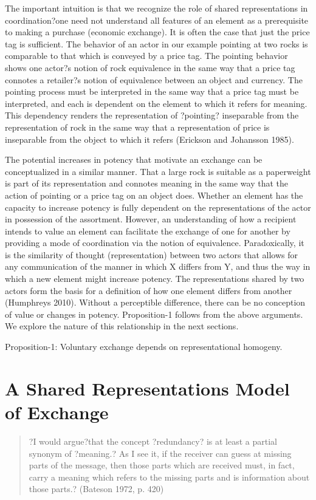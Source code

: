 The important intuition is that we recognize the role of shared representations in coordination?one need not understand all features of an element as a prerequisite to making a purchase (economic exchange). It is often the case that just the price tag is sufficient. The behavior of an actor in our example pointing at two rocks is comparable to that which is conveyed by a price tag. The pointing behavior shows one actor?s notion of rock equivalence in the same way that a price tag connotes a retailer?s notion of equivalence between an object and currency. The pointing process must be interpreted in the same way that a price tag must be interpreted, and each is dependent on the element to which it refers for meaning. This dependency renders the representation of ?pointing? inseparable from the representation of rock in the same way that a representation of price is inseparable from the object to which it refers (Erickson and Johansson 1985). 

The potential increases in potency that motivate an exchange can be conceptualized in a similar manner. That a large rock is suitable as a paperweight is part of its representation and connotes meaning in the same way that the action of pointing or a price tag on an object does. Whether an element has the capacity to increase potency is fully dependent on the representations of the actor in possession of the assortment. However, an understanding of how a recipient intends to value an element can facilitate the exchange of one for another by providing a mode of coordination via the notion of equivalence.
Paradoxically, it is the similarity of thought (representation) between two actors that allows for any communication of the manner in which X differs from Y, and thus the way in which a new element might increase potency. The representations shared by two actors form the basis for a definition of how one element differs from another (Humphreys 2010). Without a perceptible difference, there can be no conception of value or changes in potency. Proposition-1 follows from the above arguments. We explore the nature of this relationship in the next sections. 

Proposition-1: Voluntary exchange depends on representational homogeny. 

\section{A Shared Representations Model of Exchange}
\begin{small}
\begin{quote}
 ?I would argue?that the concept ?redundancy? is at least a partial synonym of ?meaning.? As I see it, if the receiver can guess at missing parts of the message, then those parts which are received must, in fact, carry a meaning which refers to the missing parts and is information about those parts.? (Bateson 1972, p. 420)
 \end{quote}
 \end{small}
 
